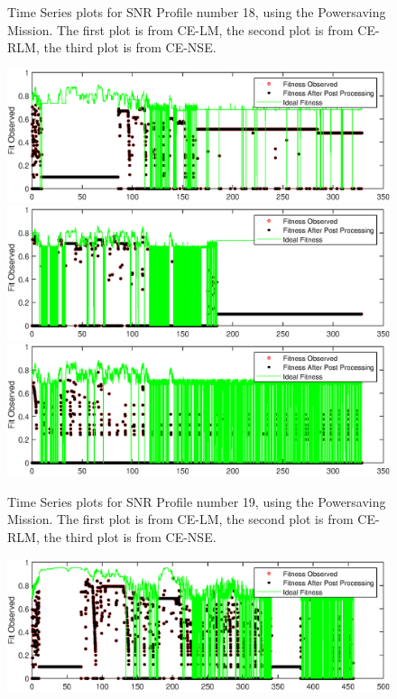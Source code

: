 \begin{appendices}
\begin{figure}[ht!]
\caption{Time Series plots for SNR Profile number 18, using the Powersaving Mission. The first plot is from CE-LM, the second plot is from CE-RLM, the third plot is from CE-NSE.}
\end{figure}
\begin{figure}[ht!]
\includegraphics{figures/c_sim_timeSeries/Fitness_timeSeries_LM_19.eps}
\includegraphics{figures/c_sim_timeSeries/Fitness_timeSeries_RLM_19.eps}
\includegraphics{figures/c_sim_timeSeries/Fitness_timeSeries_NSE_19.eps}
\caption{Time Series plots for SNR Profile number 19, using the Powersaving Mission. The first plot is from CE-LM, the second plot is from CE-RLM, the third plot is from CE-NSE.}
\end{figure}
\begin{figure}[ht!]
\includegraphics{figures/c_sim_timeSeries/Fitness_timeSeries_LM_20.eps}

\end{figure}
\end{appendices}
